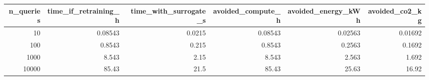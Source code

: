 \begin{tabular}{rrrrrr}
\toprule
 n\_queries &  time\_if\_retraining\_h &  time\_with\_surrogate\_s &  avoided\_compute\_h &  avoided\_energy\_kWh &  avoided\_co2\_kg \\
\midrule
        10 &               0.08543 &                 0.0215 &            0.08543 &             0.02563 &         0.01692 \\
       100 &                0.8543 &                  0.215 &             0.8543 &              0.2563 &          0.1692 \\
      1000 &                 8.543 &                   2.15 &              8.543 &               2.563 &           1.692 \\
     10000 &                 85.43 &                   21.5 &              85.43 &               25.63 &           16.92 \\
\bottomrule
\end{tabular}
